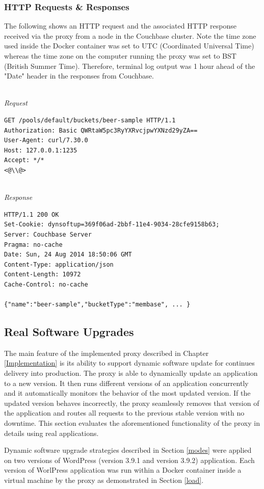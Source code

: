 \documentclass[a4paper,11pt,twoside]{report}
\begin{document}
\subsubsection*{HTTP Requests \& Responses} 
The following shows an HTTP request and the associated HTTP response received via the proxy from a node in the Couchbase cluster.  Note the time zone used inside the Docker container was set to UTC (Coordinated Universal Time) whereas the time zone on the computer running the proxy was set to BST (British Summer Time). Therefore, terminal log output was 1 hour ahead of the "Date" header in the responses from Couchbase.

\noindent\\
\textit{Request}
\begin{lstlisting}[language=terminal]
GET /pools/default/buckets/beer-sample HTTP/1.1
Authorization: Basic QWRtaW5pc3RyYXRvcjpwYXNzd29yZA==
User-Agent: curl/7.30.0
Host: 127.0.0.1:1235
Accept: */*
<@\\@>
\end{lstlisting}

\noindent\\
\textit{Response}
\begin{lstlisting}[language=terminal]
HTTP/1.1 200 OK
Set-Cookie: dynsoftup=369f06ad-2bbf-11e4-9034-28cfe9158b63;
Server: Couchbase Server
Pragma: no-cache
Date: Sun, 24 Aug 2014 18:50:06 GMT
Content-Type: application/json
Content-Length: 10972
Cache-Control: no-cache

{"name":"beer-sample","bucketType":"membase", ... }
\end{lstlisting}

\subsection{Real Software Upgrades}
The main feature of the implemented proxy described in Chapter \ref{Implementation} is its ability to support dynamic software update for continues delivery into production. The proxy is able to dynamically update an application to a new version. It then runs different versions of an application concurrently and it automatically monitors the behavior of the most updated version. If the updated version behaves incorrectly, the proxy seamlessly removes that version of the application and routes all requests to the previous stable version with no downtime. This section evaluates the aforementioned functionality of the proxy in details using real applications.

Dynamic software upgrade strategies described in Section \ref{modes} were applied on two versions of WordPress (version 3.9.1 and version 3.9.2) application. Each version of WorlPress application was run within a Docker container inside a virtual machine by the proxy as demonstrated in Section \ref{load}.
\end{document}
